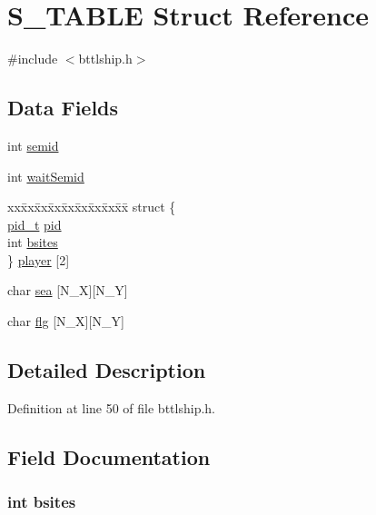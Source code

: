 \hypertarget{struct_s___t_a_b_l_e}{
\section{S\_\-TABLE Struct Reference}
\label{struct_s___t_a_b_l_e}
}


{\ttfamily \#include $<$bttlship.h$>$}

\subsection*{Data Fields}
\begin{DoxyCompactItemize}
\item 
int \hyperlink{struct_s___t_a_b_l_e_a7c35ac5305085cf7360645b8d52988b5}{semid}
\item 
int \hyperlink{struct_s___t_a_b_l_e_a9f1f2d138b13036572e13571aabb6120}{waitSemid}
\item 
\begin{tabbing}
xx\=xx\=xx\=xx\=xx\=xx\=xx\=xx\=xx\=\kill
struct \{\\
\>\hyperlink{types_8h_ab612a3a4eb0e2ced1e55ecff76260458}{pid\_t} \hyperlink{struct_s___t_a_b_l_e_ae0d46a978d5cd6707411f276ad869b9c}{pid}\\
\>int \hyperlink{struct_s___t_a_b_l_e_a5fb13144696f146a9d71fe9a41c3d7e0}{bsites}\\
\} \hyperlink{struct_s___t_a_b_l_e_a7f2737fd5784a77ca8c868b817c0ea0d}{player} \mbox{[}2\mbox{]}\\

\end{tabbing}\item 
char \hyperlink{struct_s___t_a_b_l_e_a6bee2a889a353271513547393b6a9779}{sea} \mbox{[}N\_\-X\mbox{]}\mbox{[}N\_\-Y\mbox{]}
\item 
char \hyperlink{struct_s___t_a_b_l_e_ad3bb0e8aada972de614d50a5069596b1}{flg} \mbox{[}N\_\-X\mbox{]}\mbox{[}N\_\-Y\mbox{]}
\end{DoxyCompactItemize}


\subsection{Detailed Description}


Definition at line 50 of file bttlship.h.



\subsection{Field Documentation}
\hypertarget{struct_s___t_a_b_l_e_a5fb13144696f146a9d71fe9a41c3d7e0}{
\subsubsection[{bsites}]{\setlength{\rightskip}{0pt plus 5cm}int {\bf bsites}}}
\label{struct_s___t_a_b_l_e_a5fb13144696f146a9d71fe9a41c3d7e0}


